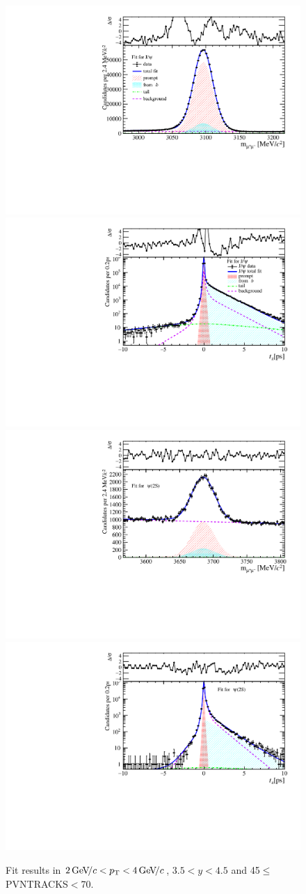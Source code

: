 \begin{figure}[H]
\begin{center}
\includegraphics[width=0.47\linewidth]{pdf/Jpsi/drawmass/n3y3pt2.pdf}
\includegraphics[width=0.47\linewidth]{pdf/Jpsi/2DFit/n3y3pt2.pdf}
\vspace*{-0.5cm}
\includegraphics[width=0.47\linewidth]{pdf/Psi2S/drawmass/n3y3pt2.pdf}
\includegraphics[width=0.47\linewidth]{pdf/Psi2S/2DFit/n3y3pt2.pdf}
\vspace*{-0.5cm}
\end{center}
\caption{Fit results in $2\text{\,Ge\kern -0.1em V\!/}c<p_{\mathrm{T}}<4\text{\,Ge\kern -0.1em V\!/}c$, $3.5<y<4.5$ and 45$\leq$PVNTRACKS$<$70.}
\label{Fitn3y3pt2}
\end{figure}

